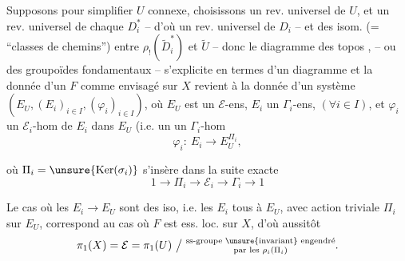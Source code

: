 Supposons pour simplifier $U$ connexe,
choisissons un rev. universel  de $U$, et un
rev. universel  de chaque $D_i^{*}$ -- d'où un
rev. universel  de $D_i$ -- et des isom.
(= ``classes de chemins'') entre $\rho_{!}(\widetilde D_i^{*})$ et $\widetilde U$
-- donc le diagramme des topos \unsure{(*)},
-- ou des groupoïdes fondamentaux --
s'explicite en termes d'un diagramme
et la donnée d'un $F$ comme envisagé sur
$X$ revient à la donnée d'un système
$(E_U,(E_i)_{i\in I},(\varphi_i)_{i\in I})$, où $E_U$ est un $\mathcal E$-ens,
$E_i$ un $\Gamma_i$-ens, $(\forall i\in I)$, et $\varphi_i$ un
$\mathcal E_i$-hom de $E_i$ dans $E_U$ (i.e. un
un $\Gamma_i$-hom
\[
\varphi_i:\ E_i\longrightarrow E_U^{\Pi_i},
\]

où  $\Pi_i=\unsure{\operatorname{Ker}(\sigma_i)}$ s'insère dans la suite exacte
\[
1\longrightarrow\Pi_i\longrightarrow\mathcal E_i\longrightarrow\Gamma_i\longrightarrow1
\]

Le cas où les $E_i\longrightarrow E_U$ sont des iso,
i.e. les $E_i$   tous à $E_U$,
avec action triviale  $\Pi_i$ sur $E_U$, correspond
au cas où $F$ est ess. loc.  sur $X$,
d'où aussitôt
\[
\pi_1(X)=\mathcal E=\pi_1(U)\ \big/\
\substack{\text{ss-groupe \unsure{invariant} engendré}\\
\text{par les }\rho_i(\Pi_i)}.
\]


